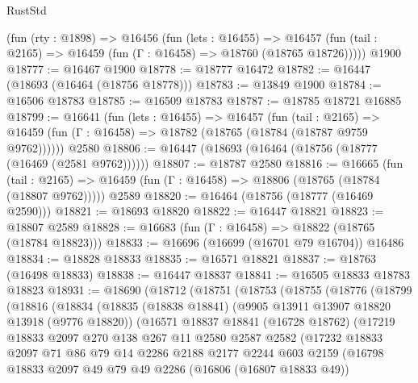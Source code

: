 \begin{lexlean}{RustStd}
\begin{coremodule}
    (fun (rty : @1898) =>
    @16456
      (fun (lets : @16455) =>
      @16457 (fun (tail : @2165) => @16459 (fun (Γ : @16458) => @18760 (@18765 @18726)))))
    @1900
@18777 := @16467 @1900
@18778 := @18777 @16472
@18782 := @16447 (@18693 (@16464 (@18756 @18778)))
@18783 := @13849 @1900
@18784 := @16506 @18783
@18785 := @16509 @18783
@18787 := @18785 @18721 @16885
@18799 := @16641
    (fun (lets : @16455) =>
    @16457
      (fun (tail : @2165) =>
      @16459 (fun (Γ : @16458) => @18782 (@18765 (@18784 (@18787 @9759 @9762))))))
    @2580
@18806 := @16447 (@18693 (@16464 (@18756 (@18777 (@16469 (@2581 @9762))))))
@18807 := @18787 @2580
@18816 := @16665
    (fun (tail : @2165) => @16459 (fun (Γ : @16458) => @18806 (@18765 (@18784 (@18807 @9762)))))
    @2589
@18820 := @16464 (@18756 (@18777 (@16469 @2590)))
@18821 := @18693 @18820
@18822 := @16447 @18821
@18823 := @18807 @2589
@18828 := @16683 (fun (Γ : @16458) => @18822 (@18765 (@18784 @18823)))
@18833 := @16696 (@16699 (@16701 @79 @16704)) @16486
@18834 := @18828 @18833
@18835 := @16571 @18821
@18837 := @18763 (@16498 @18833)
@18838 := @16447 @18837
@18841 := @16505 @18833 @18783 @18823
@18931 := @18690
    (@18712
      (@18751
        (@18753
          (@18755
            (@18776
              (@18799
                (@18816
                  (@18834
                    (@18835
                      (@18838 @18841)
                      (@9905 @13911 @13907 @18820 @13918 (@9776 @18820))
                      (@16571
                        @18837
                        @18841
                        (@16728 @18762)
                        (@17219
                          @18833
                          @2097
                          @270
                          @138
                          @267
                          @11
                          @2580
                          @2587
                          @2582
                          (@17232
                            @18833
                            @2097
                            @71
                            @86
                            @79
                            @14
                            @2286
                            @2188
                            @2177
                            @2244
                            @603
                            @2159
                            (@16798
                              @18833
                              @2097
                              @49
                              @79
                              @49
                              @2286
                              (@16806 (@16807 @18833 @49))

\end{coremodule}
\end{lexlean}
